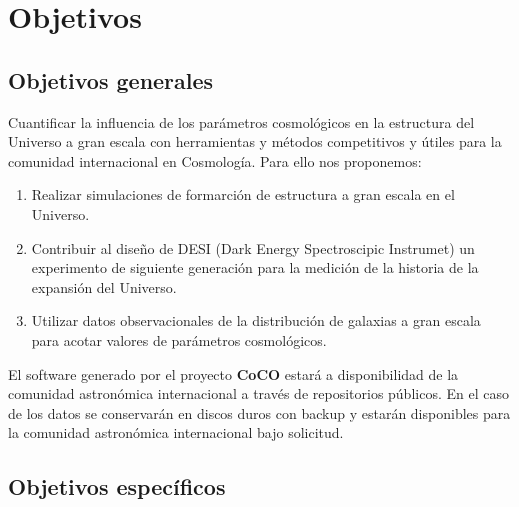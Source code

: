 \section{Objetivos}

\subsection{Objetivos generales} 

Cuantificar la influencia de los par\'ametros cosmol\'ogicos en la
  estructura del Universo a gran escala con herramientas y m\'etodos competitivos y \'utiles para la comunidad internacional en Cosmolog\'ia. Para ello nos proponemos:

\begin{enumerate}
\item  Realizar simulaciones de formarci\'on de estructura a gran escala en el Universo.
\item Contribuir al dise\~no de DESI (Dark Energy Spectroscipic Instrumet) un experimento de siguiente generaci\'on para la medici\'on de la historia de la expansi\'on del Universo. 
\item Utilizar datos observacionales de la distribuci\'on de galaxias a gran escala para acotar valores de par\'ametros cosmol\'ogicos.

\end{enumerate}

El software generado por el proyecto {\bf CoCO} estar\'a a disponibilidad  de la comunidad astron\'omica internacional a trav\'es de repositorios p\'ublicos. En el caso de los datos se conservar\'an en discos duros con backup y estar\'an disponibles para la comunidad astron\'omica internacional bajo solicitud. 

\subsection{Objetivos espec\'ificos}



